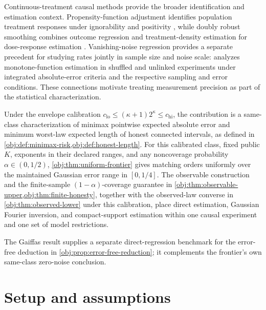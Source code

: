 \documentclass[11pt]{article}
\begin{document}
Continuous-treatment causal methods provide the broader identification and estimation context. Propensity-function adjustment identifies population treatment responses under ignorability and positivity \citep[Section 2]{Imai2004}, while doubly robust smoothing combines outcome regression and treatment-density estimation for dose-response estimation \citep[pp.~1229--1230]{Kennedy2017}. Vanishing-noise regression provides a separate precedent for studying rates jointly in sample size and noise scale: \citet[Sections 3--4]{DurotMukherjee2026} analyzes monotone-function estimation in shuffled and unlinked experiments under integrated absolute-error criteria and the respective sampling and error conditions. These connections motivate treating measurement precision as part of the statistical characterization.

Under the envelope calibration \(c_{\mathrm{lo}}\le(\kappa+1)2^\kappa\le c_{\mathrm{hi}}\), the contribution is a same-class characterization of minimax pointwise expected absolute error and minimum worst-law expected length of honest connected intervals, as defined in \cref{obj:def:minimax-risk,obj:def:honest-length}. For this calibrated class, fixed public \(K\), exponents in their declared ranges, and any noncoverage probability \(\alpha\in(0,1/2)\), \cref{obj:thm:uniform-frontier} gives matching orders uniformly over the maintained Gaussian error range  in \([0,1/4]\). The observable construction and the finite-sample \((1-\alpha)\)-coverage guarantee in \cref{obj:thm:observable-upper,obj:thm:finite-honesty}, together with the observed-law converse in \cref{obj:thm:observed-lower} under this calibration, place direct estimation, Gaussian Fourier inversion, and compact-support estimation within one causal experiment and one set of model restrictions.

The Gaiffas result supplies a separate direct-regression benchmark for the error-free deduction in \cref{obj:prop:error-free-reduction}; it complements the frontier's own same-class zero-noise conclusion.


\section{Setup and assumptions}
\end{document}
